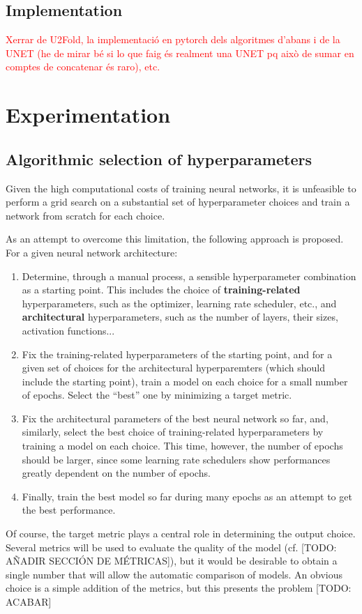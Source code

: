 \documentclass[twocolumn,twoside,a4paper,10pt]{IEEEtran}
\newcommand{\Frank}[1]{\textcolor{red}{#1}}
\begin{document}
\subsection{Implementation}
\Frank{Xerrar de U2Fold, la implementació en pytorch dels algoritmes d'abans i de la UNET (he de mirar bé si lo que faig és realment una UNET pq això de sumar en comptes de concatenar és raro), etc.}
\section{Experimentation}
\subsection{Algorithmic selection of hyperparameters}
Given the high computational costs of training neural networks, it is unfeasible to perform a grid search on a substantial set of hyperparameter choices and train a network from scratch for each choice.

As an attempt to overcome this limitation, the following approach is proposed. For a given neural network architecture:
\begin{enumerate}
  \item Determine, through a manual process, a sensible hyperparameter combination as a starting point. This includes the choice of \textbf{training-related} hyperparameters, such as the optimizer, learning rate scheduler, etc., and \textbf{architectural} hyperparameters, such as the number of layers, their sizes, activation functions...
  \item Fix the training-related hyperparameters of the starting point, and for a given set of choices for the architectural hyperparemters (which should include the starting point), train a model on each choice for a small number of epochs. Select the ``best'' one by minimizing a target metric.
  \item Fix the architectural parameters of the best neural network so far, and, similarly, select the best choice of training-related hyperparameters by training a model on each choice. This time, however, the number of epochs should be larger, since some learning rate schedulers show performances greatly dependent on the number of epochs.
  \item Finally, train the best model so far during many epochs as an attempt to get the best performance.
\end{enumerate}

Of course, the target metric plays a central role in determining the output choice. Several metrics will be used to evaluate the quality of the model (cf. [TODO: AÑADIR SECCIÓN DE MÉTRICAS]), but it would be desirable to obtain a single number that will allow the automatic comparison of models. An obvious choice is a simple addition of the metrics, but this presents the problem [TODO: ACABAR]
\end{document}
